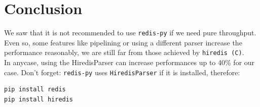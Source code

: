 \documentclass[a4paper, 11pt]{report}
\begin{document}
\chapter*{Conclusion}
We saw that it is not recommended to use \texttt{redis-py} if we need pure throughput. Even so, some features like pipelining or using a different parser increase the performance reasonably, we are still far from those achieved by \texttt{hiredis (C)}.\\

In anycase, using the HiredisParser can increase performances up to 40\% for our case. Don't forget: \texttt{redis-py} uses \texttt{HiredisParser} if it is installed, therefore:\\


\begin{minipage}{0.3\linewidth}
\begin{lstlisting}
pip install redis
pip install hiredis
\end{lstlisting}
\end{minipage}
\end{document}
